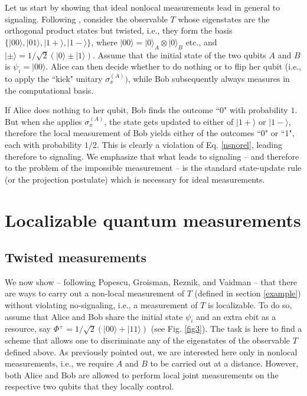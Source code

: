 \documentclass[12pt]{article}
\newcommand{\ket}[1]{| {#1} \rangle} %
\begin{document}
Let us start by showing that ideal nonlocal measurements lead in general to signaling. Following        \cite{groisman2001nonlocal, vaidman2003instantaneous}, consider the observable $T$ whose eigenstates are the orthogonal product states but twisted, i.e., they form the basis $\{\ket{00}, \ket{01}, \ket{1+}, \ket{1-}\}$, where $\ket{00}=\ket{0}_A\otimes \ket{0}_B$ etc., and $\ket{\pm}=1/\sqrt{2}(\ket{0}\pm\ket{1})$. Assume that the initial state of the two qubits $A$ and $B$ is $\psi_i=\ket{00}$. Alice can then decide whether to do nothing or to flip her qubit (i.e., to apply the ``kick" unitary $\sigma_x^{(A)})$, while Bob subsequently always measures in the computational basis.

If Alice does nothing to her qubit, Bob finds the outcome ``0" with probability $1$. But when she applies $\sigma_x^{(A)}$, the state gets updated to either of $\ket{1+}$ or $\ket{1-}$, therefore the local measurement of Bob yields either of the outcomes ``0" or ``1", each with probability  $1/2$. This is clearly a violation of Eq. \eqref{nsnorel}, leading therefore to signaling. We emphasize that what leads to signaling -- and therefore to the problem of the impossible measurement -- is the standard state-update rule (or the projection postulate) which is necessary for ideal measurements. 


 
\section{Localizable quantum measurements}
\label{localiz}

\subsection{Twisted measurements}
\label{twisted}


We now show -- following Popescu, Groisman, Reznik, and Vaidman \cite{popescu1994causality, groisman2002measurements, vaidman2003instantaneous} -- that  there are ways to carry out a non-local measurement of $T$ (defined in section \ref{example}) without violating no-signaling, i.e., a measurement of $T$ is localizable. To do so, assume that Alice and Bob share the initial state $\psi_i$  and an extra ebit as a resource, say $\Phi^+=1/\sqrt{2}(\ket{00}+\ket{11})$ (see Fig. \ref{fig3}). The task is here to find a scheme that allows one to discriminate any of the eigenstates of the observable $T$ defined above. As previously pointed out, we are interested here only in nonlocal measurements, i.e., we require $A$ and $B$ to be carried out at a distance. However, both Alice and Bob are allowed to perform local joint measurements on the respective two qubits that they locally control. 
\end{document}
